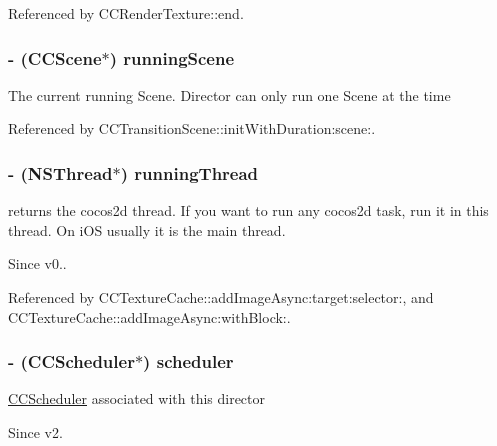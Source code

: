 Referenced by C\-C\-Render\-Texture\-::end.

\hypertarget{class_c_c_director_a3e4f16a4ebd7addb1cb666bdc9537c17}{
\subsubsection[{running\-Scene}]{\setlength{\rightskip}{0pt plus 5cm}-\/ ({\bf C\-C\-Scene}$\ast$) {\bf running\-Scene}}}\label{class_c_c_director_a3e4f16a4ebd7addb1cb666bdc9537c17}
The current running Scene. Director can only run one Scene at the time 

Referenced by C\-C\-Transition\-Scene\-::init\-With\-Duration\-:scene\-:.

\hypertarget{class_c_c_director_a423547bc44156f088a2a6a06802584fd}{
\subsubsection[{running\-Thread}]{\setlength{\rightskip}{0pt plus 5cm}-\/ ({\bf N\-S\-Thread}$\ast$) {\bf running\-Thread}}}\label{class_c_c_director_a423547bc44156f088a2a6a06802584fd}
returns the cocos2d thread. If you want to run any cocos2d task, run it in this thread. On i\-O\-S usually it is the main thread. \begin{DoxySince}{Since}
v0.. 
\end{DoxySince}


Referenced by C\-C\-Texture\-Cache\-::add\-Image\-Async\-:target\-:selector\-:, and C\-C\-Texture\-Cache\-::add\-Image\-Async\-:with\-Block\-:.

\hypertarget{class_c_c_director_a2a779aef7ff84b29fbec784844d6eed3}{
\subsubsection[{scheduler}]{\setlength{\rightskip}{0pt plus 5cm}-\/ ({\bf C\-C\-Scheduler}$\ast$) {\bf scheduler}}}\label{class_c_c_director_a2a779aef7ff84b29fbec784844d6eed3}
\hyperlink{class_c_c_scheduler}{C\-C\-Scheduler} associated with this director \begin{DoxySince}{Since}
v2. 
\end{DoxySince}


